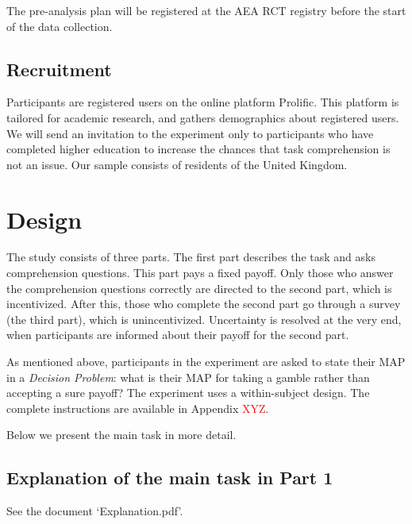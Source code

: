 The pre-analysis plan will be registered at the AEA RCT registry before the start of the data collection.


\subsection{Recruitment}
Participants are registered users on the online platform Prolific.
This platform is tailored for academic research, and gathers demographics about registered users.
We will send an invitation to the experiment only to participants who have completed higher education to increase the chances that task comprehension is not an issue.
Our sample consists of residents of the United Kingdom.



\section{Design}
The study consists of three parts.
The first part describes the task and asks comprehension questions.
This part pays a fixed payoff.
Only those who answer the comprehension questions correctly are directed to the second part, which is incentivized.
After this, those who complete the second part go through a survey (the third part), which is unincentivized.
Uncertainty is resolved at the very end, when participants are informed about their payoff for the second part.

As mentioned above, participants in the experiment are asked to state their MAP in a \textit{Decision Problem}: what is their MAP for taking a gamble rather than accepting a sure payoff?
The experiment uses a within-subject design.
The complete instructions are available in Appendix \textcolor{red}{XYZ}.

Below we present the main task in more detail.

\subsection{Explanation of the main task in Part 1}
See the document `Explanation.pdf'.


